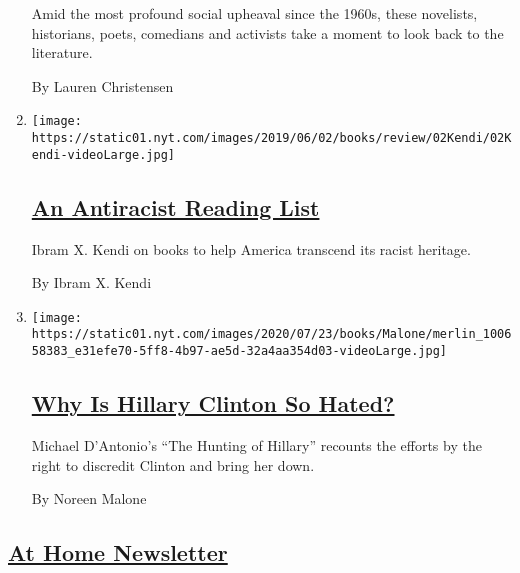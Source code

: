 \begin{enumerate}
  Amid the most profound social upheaval since the 1960s, these
  novelists, historians, poets, comedians and activists take a moment to
  look back to the literature.

  By Lauren Christensen
\item
  \texttt{[image: https://static01.nyt.com/images/2019/06/02/books/review/02Kendi/02Kendi-videoLarge.jpg]}

  \hypertarget{an-antiracist-reading-list}{%
  \subsection{\texorpdfstring{\href{/2019/05/29/books/review/antiracist-reading-list-ibram-x-kendi.html}{An
  Antiracist Reading
  List}}{An Antiracist Reading List}}\label{an-antiracist-reading-list}}

  Ibram X. Kendi on books to help America transcend its racist heritage.

  By Ibram X. Kendi
\item
  \texttt{[image: https://static01.nyt.com/images/2020/07/23/books/Malone/merlin\_100658383\_e31efe70-5ff8-4b97-ae5d-32a4aa354d03-videoLarge.jpg]}

  \hypertarget{why-is-hillary-clinton-so-hated}{%
  \subsection{\texorpdfstring{\href{/2020/07/28/books/review/the-hunting-of-hillary-michael-dantonio.html}{Why
  Is Hillary Clinton So
  Hated?}}{Why Is Hillary Clinton So Hated?}}\label{why-is-hillary-clinton-so-hated}}

  Michael D'Antonio's ``The Hunting of Hillary'' recounts the efforts by
  the right to discredit Clinton and bring her down.

  By Noreen Malone
\end{enumerate}

\hypertarget{at-home-newsletter}{%
\subsection{\texorpdfstring{\protect\hyperlink{}{At Home
Newsletter}}{At Home Newsletter}}\label{at-home-newsletter}}

